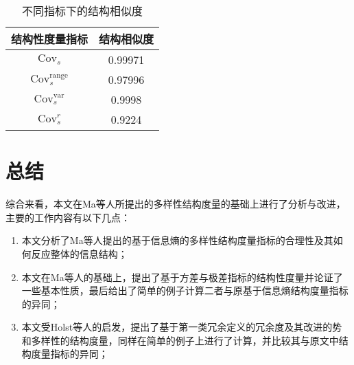 \documentclass{../notes}
\newcommand{\Cov}{\text{Cov}}
\begin{document}
    \begin{table}[ht]
        \centering
        \caption{不同指标下的结构相似度}
        \begin{tabular}{cc}
            \toprule
            结构性度量指标 & 结构相似度 \\
            \midrule
            $\Cov_s$ & 0.99971 \\
            $\Cov_s^{\text{range}}$ & 0.97996 \\
            $\Cov_s^{\text{var}}$ & 0.9998 \\
            $\Cov_s^r$ & 0.9224 \\
            \bottomrule
        \end{tabular}
        \label{tbl:2}
    \end{table}

    \section{总结}

    综合来看，本文在Ma等人所提出的多样性结构度量的基础上进行了分析与改进，主要的工作内容有以下几点：

    \begin{enumerate}
        \item 本文分析了Ma等人提出的基于信息熵的多样性结构度量指标的合理性及其如何反应整体的信息结构；
        \item 本文在Ma等人的基础上，提出了基于方差与极差指标的结构性度量并论证了一些基本性质，最后给出了简单的例子计算二者与原基于信息熵结构度量指标的异同；
        \item 本文受Holst等人的启发，提出了基于第一类冗余定义的冗余度及其改进的势和多样性的结构度量，同样在简单的例子上进行了计算，并比较其与原文中结构度量指标的异同；
    \end{enumerate}

    \nocite{yager1992specificity}
    \nocite{yager1998measures}
    \nocite{yager2008measures}
    \nocite{higashi1982measures}
    \nocite{higashi1983notion}

    
    
\end{document}
